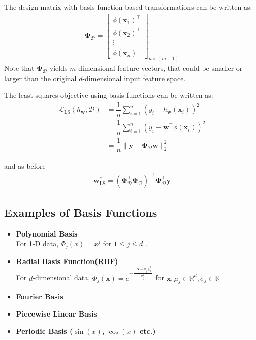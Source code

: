 \documentclass{report}
\newcommand{\x}{\mathbf{x}}
\newcommand{\D}{\mathcal{D}}
\newcommand\norm[1]{\lVert#1\rVert}
\begin{document}
The design matrix with basis function-based transformations can be written as:
\begin{align*}
  \mathbf{\Phi}_\D =
  \begin{bmatrix}
    \phi(\x_1)^\top \\
    \phi(\x_2)^\top \\
    \vdots          \\
    \phi(\x_n)^\top
  \end{bmatrix}_{n\times(m + 1)}
\end{align*}
Note that $\mathbf{\Phi}_\D$ yields $m$-dimensional feature vectors, that could be smaller or larger than the original $d$-dimensional input feature space.

The least-squares objective using basis functions can be written as:
\begin{align*}
  \mathcal{L}_{\text{LS}}(h_\mathbf{w}, \D) & = \dfrac{1}{n}\sum_{i = 1}^n(y_i - h_\mathbf{w}(\x_i))^2           \\
                                            & = \dfrac{1}{n}\sum_{i = 1}^n(y_i - \mathbf{w}^\top\phi(\x_i))^2    \\
                                            & = \dfrac{1}{n}\norm{ \mathbf{y} - \mathbf{\Phi}_\D\mathbf{w} }_2^2
\end{align*}

and as before
\begin{align*}
  \mathbf{w}^*_{\text{LS}} = \left(\mathbf{\Phi}_\D^\top\mathbf{\Phi}_\D\right)^{-1}\mathbf{\Phi}_\D^\top\mathbf{y}
\end{align*}

\newpage
\subsection{Examples of Basis Functions}
\begin{itemize}
  \item \textbf{Polynomial Basis}\\ For 1-D data, \(\Phi_j(x) = x^j\) for \(1 \leq j \leq d\) .
  \item \textbf{Radial Basis Function(RBF)}\\
        For $d$-dimensional data, \(\Phi_j(\mathbf{x}) = e^{-\frac{\|\mathbf{x}-\mu_j\|_2^2}{\sigma_j^2}}\) for \(\mathbf{x},\mu_j \in \mathbb{R}^d, \sigma_j \in \mathbb{R}\) .
  \item \textbf{Fourier Basis}
  \item \textbf{Piecewise Linear Basis}
  \item \textbf{Periodic Basis ($\sin(x)$, $\cos(x)$ etc.)}
\end{itemize}
\end{document}
